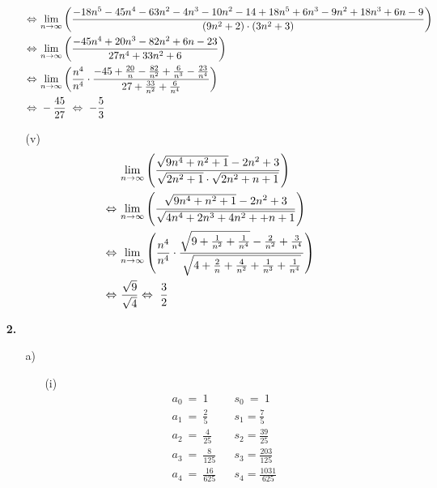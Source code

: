\documentclass [a4paper,12pt]{article}
\begin{document}
\begin{enumerate}
\begin{enumerate}
\begin{align}
                        \Leftrightarrow \ &\underset{n \to \infty}{\lim}
			\left( \frac{-18n^5-45n^4-63n^2-4n^3-10n^2-14+18n^5+6n^3-9n^2+18n^3+6n-9}{(9n^2+2)\cdot(3n^2+3)} \right) \\
			\Leftrightarrow \ &\underset{n \to \infty}{\lim}
			\left( \frac{-45n^4+20n^3-82n^2+6n-23}{27n^4+33n^2+6} \right) \\
			\Leftrightarrow \ &\underset{n \to \infty}{\lim}
			\left( \frac{n^4}{n^4}\cdot\frac{-45+\frac{20}{n}-\frac{82}{n^2}+\frac{6}{n^3}-\frac{23}{n^4}}{27+\frac{33}{n^2}+\frac{6}{n^4}} \right) \\
			\Leftrightarrow \ &-\frac{45}{27} \ \Leftrightarrow \ -\frac{5}{3} \\
		    \end{align}
		\item[(v)]
		    \begin{align}
			&\limp \left(\frac{\sqrt{9n^4+n^2+1}-2n^2+3}{\sqrt{2n^2+1} \cdot \sqrt{2n^2+n+1}} \right) \\
			\Leftrightarrow \ &\limp 
			\left( \frac{\sqrt{9n^4+n^2+1}-2n^2+3}{\sqrt{4n^4+2n^3+4n^2++n+1}} \right) \\
			\Leftrightarrow \ &\limp
			\left( \frac{n^4}{n^4} \cdot \frac{\sqrt{9+\frac{1}{n^2}+\frac{1}{n^4}}-\frac{2}{n^2}+\frac{3}{n^4}}{\sqrt{4+\frac{2}{n}+\frac{4}{n^2}+\frac{1}{n^3}+\frac{1}{n^4}}}\right) \\
			 \Leftrightarrow \ &\frac{\sqrt{9}}{\sqrt{4}}  \Leftrightarrow \ \frac{3}{2} %
                    \end{align}
            \end{enumerate}
        \item[\textbf{2.}]
            \begin{enumerate}
                \item[a)]
                    \begin{enumerate}
                        \item[(i)]
                            \begin{align}
                                &a_0 \ = \ 1		 	&&  	s_0 \ = \ 1\\
                                &a_1 \ = \ \frac{2}{5} 		&&	s_1 = \frac{7}{5}\\
                                &a_2 \ = \ \frac{4}{25} 	&&	s_2 = \frac{39}{25}\\
                                &a_3 \ = \ \frac{8}{125} 	&&	s_3 = \frac{203}{125}\\
                                &a_4 \ = \ \frac{16}{625}	&&	s_4 = \frac{1031}{625} \\

\end{align}
\end{enumerate}
\end{enumerate}
\end{enumerate}
\end{document}
